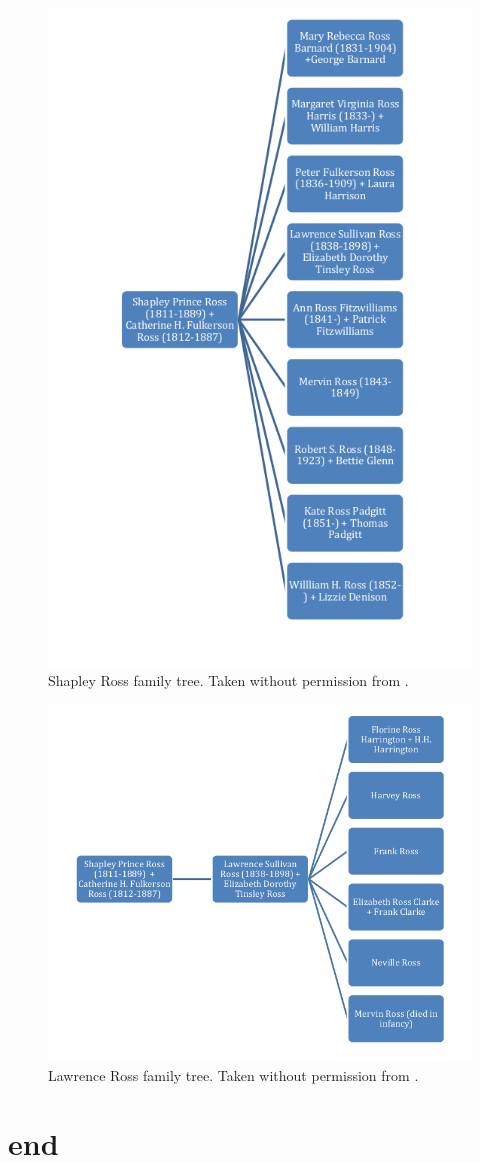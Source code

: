 \documentclass[12pt]{article}
\begin{document}
\begin{figure}[h]
\centering
\includegraphics[width=0.6\linewidth]{figures/shapley_ross_family_tree}
\caption{Shapley Ross family tree. Taken without permission from \cite{rosspapersummary}.}
\end{figure}

\begin{figure}[h]
\centering
\includegraphics[width=0.7\linewidth]{figures/lawrence_ross_family_tree}
\caption{Lawrence Ross family tree. Taken without permission from \cite{rosspapersummary}.}
\end{figure}

\newpage
\section{end}

\newpage
\printbibliography

\end{document}
